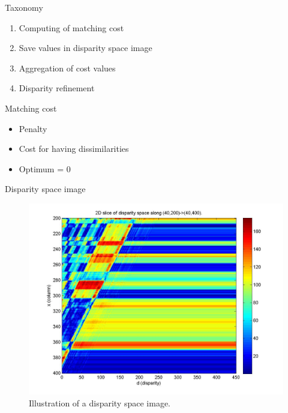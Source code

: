 \documentclass[10pt]{beamer}
\begin{document}
\begin{frame}[fragile]{Taxonomy}
  \begin{enumerate}
    \item Computing of matching cost
    \item Save values in disparity space image
    \item Aggregation of cost values
    \item Disparity refinement
  \end{enumerate}
\end{frame}

\begin{frame}[fragile]{Matching cost}
  \begin{itemize}
    \item Penalty
    \item Cost for having dissimilarities
    \item Optimum = 0
  \end{itemize}
\end{frame}

\begin{frame}[fragile]{Disparity space image}
  \begin{figure}[h!]
    \centering
    \includegraphics[width=1.0\textwidth]{../paper/src/images/dsi.png}
    \caption[Disparity space image]{Illustration of a disparity space image.\protect\footnotemark}
    \label{fig:dsi}
  \end{figure}
\end{frame}
\end{document}
